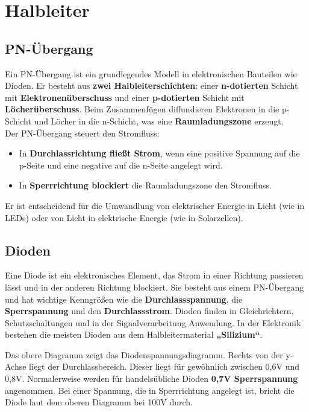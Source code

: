 \chapter{Halbleiter}

\section{PN-Übergang}
Ein PN-Übergang ist ein grundlegendes Modell in elektronischen Bauteilen wie Dioden. Er besteht aus \textbf{zwei Halbleiterschichten}: einer \textbf{n-dotierten} Schicht mit \textbf{Elektronenüberschuss} und einer \textbf{p-dotierten} Schicht mit \textbf{Löcherüberschuss}. Beim Zusammenfügen diffundieren Elektronen in die p-Schicht und Löcher in die n-Schicht, was eine \textbf{Raumladungszone} erzeugt.\\

Der PN-Übergang steuert den Stromfluss:\\
\begin{itemize}
    \item In \textbf{Durchlassrichtung fließt Strom}, wenn eine positive Spannung auf die p-Seite und eine negative auf die n-Seite angelegt wird.
    \item In \textbf{Sperrrichtung blockiert} die Raumladungszone den Stromfluss.
\end{itemize}
Er ist entscheidend für die Umwandlung von elektrischer Energie in Licht (wie in LEDs) oder von Licht in elektrische Energie (wie in Solarzellen).

\section{Dioden}
Eine Diode ist ein elektronisches Element, das Strom in einer Richtung passieren lässt und in der anderen Richtung blockiert. Sie besteht aus einem PN-Übergang und hat wichtige Kenngrößen wie die \textbf{Durchlassspannung}, die \textbf{Sperrspannung} und den \textbf{Durchlassstrom}. Dioden finden in Gleichrichtern, Schutzschaltungen und in der Signalverarbeitung Anwendung. In der Elektronik bestehen die meisten Dioden aus dem Halbleitermaterial \textbf{„Silizium“}.

Das obere Diagramm zeigt das Diodenspannungsdiagramm. Rechts von der y-Achse liegt der Durchlassbereich. Dieser liegt für gewöhnlich zwischen 0,6V und 0,8V. Normalerweise werden für handelsübliche Dioden \textbf{0,7V Sperrspannung} angenommen. Bei einer Spannung, die in Sperrrichtung angelegt ist, bricht die Diode laut dem oberen Diagramm bei 100V durch.


